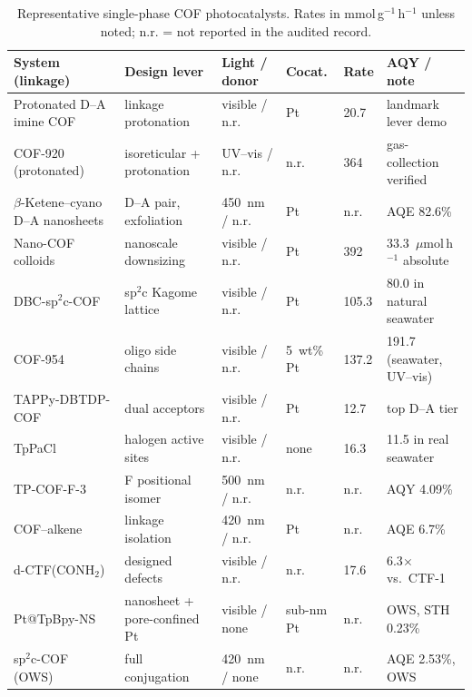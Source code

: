 \begin{table}[t]
  \centering
  \caption{Representative single-phase COF photocatalysts. Rates in
  mmol\,g$^{-1}$\,h$^{-1}$ unless noted; n.r. = not reported in the audited
  record.}
  \label{tab:single}
  \small
  \begin{tabular}{P{3.1cm} P{2.5cm} P{2.2cm} P{1.6cm} P{1.7cm} P{2.4cm}}
    \toprule
    System (linkage) & Design lever & Light / donor & Cocat. & Rate & AQY / note \\
    \midrule
    Protonated D--A imine COF~\cite{yang2021protonated}
      & linkage protonation & visible / n.r. & Pt & 20.7 & landmark lever demo \\
    COF-920 (protonated)~\cite{dong2025synergistic}
      & isoreticular + protonation & UV--vis / n.r. & n.r. & 364
      & gas-collection verified \\
    $\beta$-Ketene--cyano D--A nanosheets~\cite{li2022covalent}
      & D--A pair, exfoliation & 450~nm / n.r. & Pt & n.r. & AQE 82.6\% \\
    Nano-COF colloids~\cite{zhao2024nanoscale}
      & nanoscale downsizing & visible / n.r. & Pt & 392 & 33.3~$\mu$mol\,h$^{-1}$ absolute \\
    DBC-sp$^2$c-COF~\cite{yu2025topology}
      & sp$^2$c Kagome lattice & visible / n.r. & Pt & 105.3
      & 80.0 in natural seawater \\
    COF-954~\cite{zhong2023oligo}
      & oligo side chains & visible / n.r. & 5~wt\% Pt & 137.2
      & 191.7 (seawater, UV--vis) \\
    TAPPy-DBTDP-COF~\cite{liu2024dual}
      & dual acceptors & visible / n.r. & Pt & 12.7 & top D--A tier \\
    TpPaCl~\cite{ma2025engineering}
      & halogen active sites & visible / n.r. & none & 16.3
      & 11.5 in real seawater \\
    TP-COF-F-3~\cite{zhu2025fluorination}
      & F positional isomer & 500~nm / n.r. & n.r. & n.r. & AQY 4.09\% \\
    COF--alkene~\cite{mo2020alkene}
      & linkage isolation & 420~nm / n.r. & Pt & n.r. & AQE 6.7\% \\
    d-CTF(CONH$_2$)~\cite{gu2026single}
      & designed defects & visible / n.r. & n.r. & 17.6 & 6.3$\times$ vs.\ CTF-1 \\
    Pt@TpBpy-NS~\cite{yang2023engineering}
      & nanosheet + pore-confined Pt & visible / none & sub-nm Pt
      & n.r. & OWS, STH 0.23\% \\
    sp$^2$c-COF (OWS)~\cite{cheng2023fully}
      & full conjugation & 420~nm / none & n.r. & n.r. & AQE 2.53\%, OWS \\
    \bottomrule
  \end{tabular}
\end{table}

